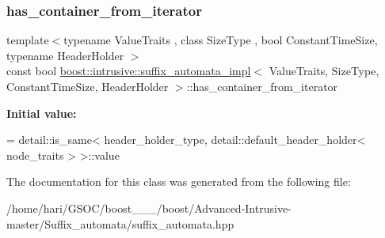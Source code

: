 \subsubsection{\texorpdfstring{has\+\_\+container\+\_\+from\+\_\+iterator}{has\_container\_from\_iterator}}
{\footnotesize\ttfamily template$<$typename Value\+Traits , class Size\+Type , bool Constant\+Time\+Size, typename Header\+Holder $>$ \\
const bool \hyperlink{classboost_1_1intrusive_1_1suffix__automata__impl}{boost\+::intrusive\+::suffix\+\_\+automata\+\_\+impl}$<$ Value\+Traits, Size\+Type, Constant\+Time\+Size, Header\+Holder $>$\+::has\+\_\+container\+\_\+from\+\_\+iterator\hspace{0.3cm}{\ttfamily [static]}}

{\bfseries Initial value\+:}
\begin{DoxyCode}
=
        detail::is\_same< header\_holder\_type, detail::default\_header\_holder< node\_traits > >::value
\end{DoxyCode}


The documentation for this class was generated from the following file\+:\begin{DoxyCompactItemize}
\item 
/home/hari/\+G\+S\+O\+C/boost\+\_\+\_\+\_/boost/\+Advanced-\/\+Intrusive-\/master/\+Suffix\+\_\+automata/suffix\+\_\+automata.\+hpp\end{DoxyCompactItemize}
